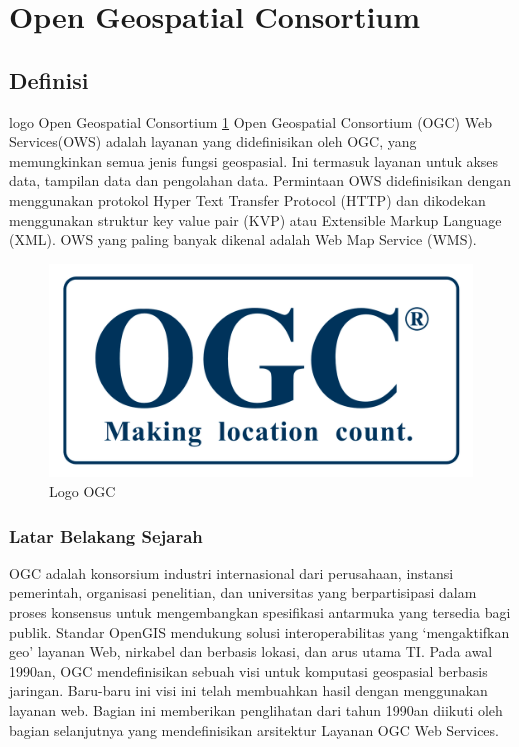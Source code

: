 
\section{Open Geospatial Consortium}

\subsection{Definisi}

logo Open Geospatial Consortium \ref{ogc} Open Geospatial Consortium (OGC) Web Services(OWS) adalah layanan yang didefinisikan oleh OGC, yang memungkinkan semua jenis fungsi geospasial. Ini termasuk layanan untuk akses data, tampilan data dan pengolahan data. Permintaan OWS didefinisikan dengan menggunakan protokol Hyper Text Transfer Protocol (HTTP) dan dikodekan menggunakan struktur key value pair (KVP) atau Extensible Markup Language (XML). OWS yang paling banyak dikenal adalah Web Map Service (WMS). \cite{lupp2008open} 

\begin{figure}[ht]
	\centerline{\includegraphics[width=1\textwidth]{figures/ogc.png}}
	\caption{Logo OGC}
	\label{ogc}
	\end{figure}

\subsubsection{Latar Belakang Sejarah}

OGC adalah konsorsium industri internasional dari perusahaan, instansi pemerintah, organisasi penelitian, dan universitas yang berpartisipasi dalam proses konsensus untuk mengembangkan spesifikasi antarmuka yang tersedia bagi publik. Standar OpenGIS mendukung solusi interoperabilitas yang `mengaktifkan geo' layanan Web, nirkabel dan berbasis lokasi, dan arus utama TI. Pada awal 1990an, OGC mendefinisikan sebuah visi untuk komputasi geospasial berbasis jaringan. Baru-baru ini visi ini telah membuahkan hasil dengan menggunakan layanan web. Bagian ini memberikan penglihatan dari tahun 1990an diikuti oleh bagian selanjutnya yang mendefinisikan arsitektur Layanan OGC Web Services. 

